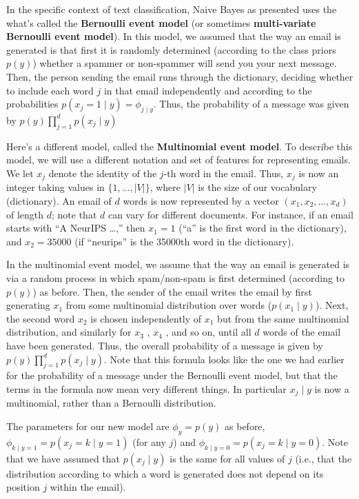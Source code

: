 In the specific context of text classification, Naive Bayes as presented uses
the what's called the \textbf{Bernoulli event model} (or sometimes \textbf{multi-variate
Bernoulli event model}). In this model, we assumed that the way an email
is generated is that first it is randomly determined (according to the class
priors $p(y)$) whether a spammer or non-spammer will send you your next
message. Then, the person sending the email runs through the dictionary,
deciding whether to include each word $j$ in that email independently and
according to the probabilities $p(x_j = 1 \mid y) = \phi_{j \mid y}$. Thus, the probability of a
message was given by $p(y) \prod_{j=1}^d p(x_j \mid y)$

Here's a different model, called the \textbf{Multinomial event model}. To
describe this model, we will use a different notation and set of features for
representing emails. We let $x_j$ denote the identity of the $j$-th word in the
email. Thus, $x_j$ is now an integer taking values in $\{1,\ldots,|V|\}$, where $|V|$
is the size of our vocabulary (dictionary). An email of $d$ words is now represented
by a vector $(x_1 ,x_2 ,\ldots,x_d )$ of length $d$; note that $d$ can vary for
different documents. For instance, if an email starts with ``A NeurIPS \ldots,''
then $x_1 = 1$ (``a'' is the first word in the dictionary), and $x_2 = 35000$ (if
``neurips'' is the 35000th word in the dictionary).

In the multinomial event model, we assume that the way an email is
generated is via a random process in which spam/non-spam is first determined
(according to $p(y)$) as before. Then, the sender of the email writes the
email by first generating $x_1$ from some multinomial distribution over words
($p(x_1 \mid y)$). Next, the second word $x_2$ is chosen independently of $x_1$ but from
the same multinomial distribution, and similarly for $x_3$ , $x_4$ , and so on, until
all $d$ words of the email have been generated. Thus, the overall probability of
a message is given by $p(y)
\prod^d_{j=1} p(x_j \mid y)$. Note that this formula looks like the
one we had earlier for the probability of a message under the Bernoulli event
model, but that the terms in the formula now mean very different things. In
particular $x_j \mid y$ is now a multinomial, rather than a Bernoulli distribution.

The parameters for our new model are $\phi_y = p(y)$ as before, $\phi_{k \mid y=1} =
p(x_j = k \mid y = 1)$ (for any $j$) and $\phi_{k \mid y=0} = p(x_j = k \mid y = 0)$. Note that we have
assumed that $p(x_j \mid y)$ is the same for all values of $j$ (i.e., that the distribution
according to which a word is generated does not depend on its position $j$
within the email).

